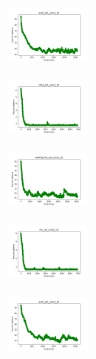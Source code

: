 \begin{figure}[H]
\begin{subfigure}
    \end{subfigure}
    \hfill
    \begin{subfigure}
        \centering
        \includegraphics[width=0.234\textwidth]{img/am01mej/ecoli_set_const_10_589741062_cost.png}
    \end{subfigure}
    \hfill
    \begin{subfigure}
        \centering
        \includegraphics[width=0.234\textwidth]{img/am01mej/rand_set_const_10_589741062_cost.png}
    \end{subfigure}
    \hfill
    \begin{subfigure}
        \centering
        \includegraphics[width=0.234\textwidth]{img/am01mej/newthyroid_set_const_10_589741062_cost.png}
    \end{subfigure}
    \hfill
    \begin{subfigure}
        \centering
        \includegraphics[width=0.234\textwidth]{img/am01mej/iris_set_const_10_277451237_cost.png}
    \end{subfigure}
    \hfill
    \begin{subfigure}
        \centering
        \includegraphics[width=0.234\textwidth]{img/am01mej/ecoli_set_const_10_277451237_cost.png}
    \end{subfigure}

\end{figure}
